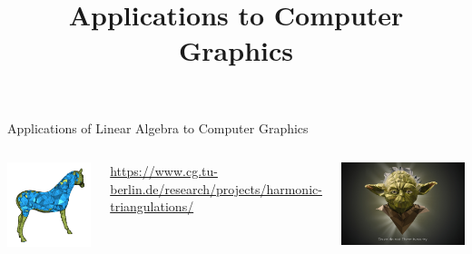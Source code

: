 \documentclass[xcolor=dvipsnames,aspectratio=169,t]{beamer}
\title{Applications to Computer Graphics}
\begin{document}
\maketitle

\begin{frame}{Applications of Linear Algebra to Computer Graphics}
\begin{columns}[T]

\column{0.5\tw}

\includegraphics[width=0.8\tw]{images/fig-horse-triangular.png}

{\tiny \href{https://www.cg.tu-berlin.de/research/projects/harmonic-triangulations/}{\alert{https://www.cg.tu-berlin.de/research/projects/harmonic-triangulations/}}}

\column{0.5\tw}

\includegraphics[width=0.9\tw]{images/fig-yoda.jpg}


\end{columns}
\end{frame}
\end{document}
